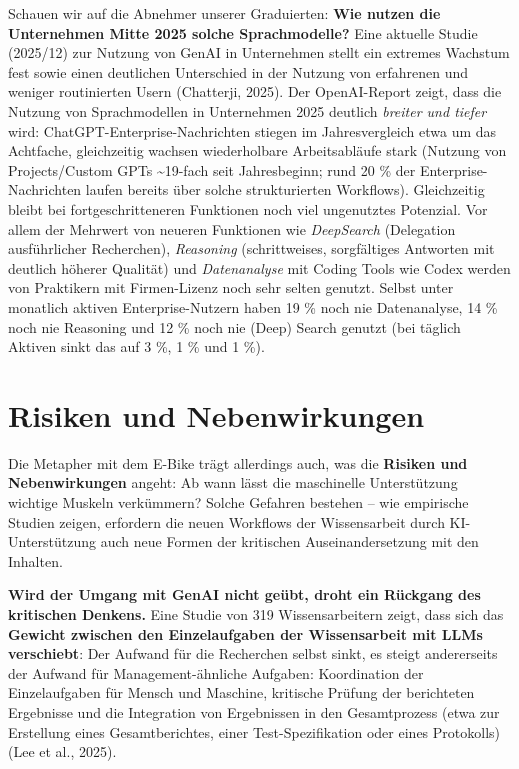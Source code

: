 \documentclass[
  ngerman,
  letterpaper,
  DIV=11]{scrreprt}
\begin{document}
Schauen wir auf die Abnehmer unserer Graduierten: \textbf{Wie nutzen die
Unternehmen Mitte 2025 solche Sprachmodelle?} Eine aktuelle Studie
(2025/12) zur Nutzung von GenAI in Unternehmen stellt ein extremes
Wachstum fest sowie einen deutlichen Unterschied in der Nutzung von
erfahrenen und weniger routinierten Usern (Chatterji, 2025). Der
OpenAI-Report zeigt, dass die Nutzung von Sprachmodellen in Unternehmen
2025 deutlich \emph{breiter und tiefer} wird:
ChatGPT-Enterprise-Nachrichten stiegen im Jahresvergleich etwa um das
Achtfache, gleichzeitig wachsen wiederholbare Arbeitsabläufe stark
(Nutzung von Projects/Custom GPTs \textasciitilde19-fach seit
Jahresbeginn; rund 20 \% der Enterprise-Nachrichten laufen bereits über
solche strukturierten Workflows). Gleichzeitig bleibt bei
fortgeschritteneren Funktionen noch viel ungenutztes Potenzial. Vor
allem der Mehrwert von neueren Funktionen wie \emph{DeepSearch}
(Delegation ausführlicher Recherchen), \emph{Reasoning} (schrittweises,
sorgfältiges Antworten mit deutlich höherer Qualität) und
\emph{Datenanalyse} mit Coding Tools wie Codex werden von Praktikern mit
Firmen-Lizenz noch sehr selten genutzt. Selbst unter monatlich aktiven
Enterprise-Nutzern haben 19 \% noch nie Datenanalyse, 14 \% noch nie
Reasoning und 12 \% noch nie (Deep) Search genutzt (bei täglich Aktiven
sinkt das auf 3 \%, 1 \% und 1 \%).

\section{Risiken und Nebenwirkungen}\label{sec-risiken}

Die Metapher mit dem E-Bike trägt allerdings auch, was die
\textbf{Risiken und Nebenwirkungen} angeht: Ab wann lässt die
maschinelle Unterstützung wichtige Muskeln verkümmern? Solche Gefahren
bestehen -- wie empirische Studien zeigen, erfordern die neuen Workflows
der Wissensarbeit durch KI-Unterstützung auch neue Formen der kritischen
Auseinandersetzung mit den Inhalten.

\textbf{Wird der Umgang mit GenAI nicht geübt, droht ein Rückgang des
kritischen Denkens.} Eine Studie von 319 Wissensarbeitern zeigt, dass
sich das \textbf{Gewicht zwischen den Einzelaufgaben der Wissensarbeit
mit LLMs verschiebt}: Der Aufwand für die Recherchen selbst sinkt, es
steigt andererseits der Aufwand für Management-ähnliche Aufgaben:
Koordination der Einzelaufgaben für Mensch und Maschine, kritische
Prüfung der berichteten Ergebnisse und die Integration von Ergebnissen
in den Gesamtprozess (etwa zur Erstellung eines Gesamtberichtes, einer
Test-Spezifikation oder eines Protokolls) (Lee et al., 2025).
\end{document}
